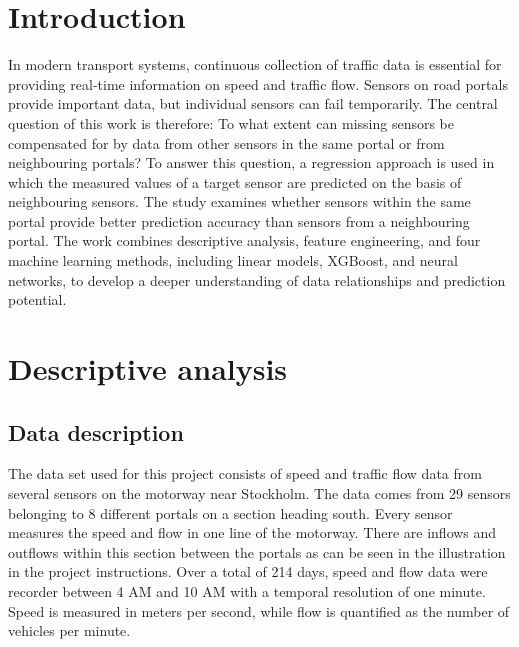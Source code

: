 	\newpage
	\setcounter{page}{1}	%
	

	\section{Introduction}
	In modern transport systems, continuous collection of traffic data is essential for providing real-time information on speed and traffic flow. Sensors on road portals provide important data, but individual sensors can fail temporarily. The central question of this work is therefore: To what extent can missing sensors be compensated for by data from other sensors in the same portal or from neighbouring portals?
	To answer this question, a regression approach is used in which the measured values of a target sensor are predicted on the basis of neighbouring sensors. The study examines whether sensors within the same portal provide better prediction accuracy than sensors from a neighbouring portal. 
	The work combines descriptive analysis, feature engineering, and four machine learning methods, including linear models, XGBoost, and neural networks, to develop a deeper understanding of data relationships and prediction potential.
	
	\section{Descriptive analysis}
	\subsection{Data description}
	The data set used for this project consists of speed and traffic flow data from several sensors on the motorway near Stockholm. The data comes from 29 sensors belonging to 8 different portals on a section heading south. Every sensor measures the speed and flow in one line of the motorway. There are inflows and outflows within this section between the portals as can be seen in the illustration in the project instructions.
	\noindent Over a total of 214 days, speed and flow data were recorder between 4 AM and 10 AM with a temporal resolution of one minute.
	Speed is measured in meters per second, while flow is quantified as the number of vehicles per minute.
